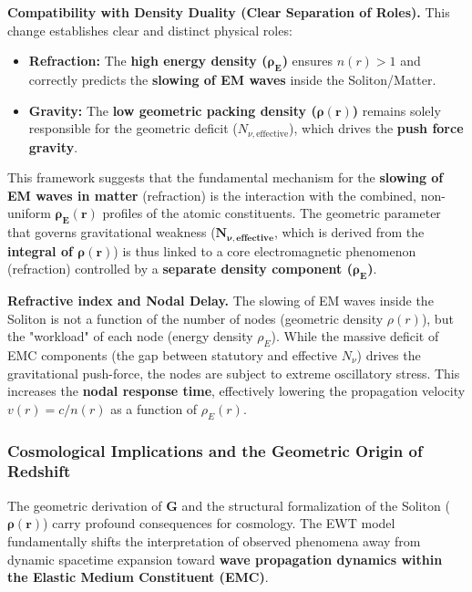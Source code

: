 \documentclass[10pt,a4paper]{article}
\begin{document}
\textbf{Compatibility with Density Duality (Clear Separation of Roles).} This change establishes clear and distinct physical roles:
\begin{itemize}
	\item \textbf{Refraction:} The \textbf{high energy density ($\mathbf{\rho_{\text{E}}}$)} ensures $n(r) > 1$ and correctly predicts the \textbf{slowing of EM waves} inside the Soliton/Matter.
	\item \textbf{Gravity:} The \textbf{low geometric packing density ($\mathbf{\rho(r)}$)} remains solely responsible for the geometric deficit ($N_{\nu,\text{effective}}$), which drives the \textbf{push force gravity}.
\end{itemize}
This framework suggests that the fundamental mechanism for the \textbf{slowing of EM waves in matter} (refraction) is the interaction with the combined, non-uniform $\mathbf{\rho_{\text{E}}(r)}$ profiles of the atomic constituents. The geometric parameter that governs gravitational weakness ($\mathbf{N_{\nu,\text{effective}}}$, which is derived from the \textbf{integral of $\mathbf{\rho(r)}$}) is thus linked to a core electromagnetic phenomenon (refraction) controlled by a \textbf{separate density component ($\mathbf{\rho_{\text{E}}}$)}.

\textbf{Refractive index and Nodal Delay.} The slowing of EM waves inside the Soliton is not a function of the number of nodes (geometric density $\rho(r)$), but the "workload" of each node (energy density $\rho_E$). While the massive deficit of EMC components (the gap between statutory and effective $N_{\nu}$) drives the gravitational push-force, the nodes are subject to extreme oscillatory stress. This increases the \textbf{nodal response time}, effectively lowering the propagation velocity $v(r) = c/n(r)$ as a function of $\rho_E(r)$.

\subsubsection*{Cosmological Implications and the Geometric Origin of Redshift}
\label{sec:cosmology_implications}

The geometric derivation of $\mathbf{G}$ and the structural formalization of the Soliton ($\mathbf{\rho(r)}$) carry profound consequences for cosmology. The EWT model fundamentally shifts the interpretation of observed phenomena away from dynamic spacetime expansion toward \textbf{wave propagation dynamics within the Elastic Medium Constituent (EMC)}.
\end{document}
